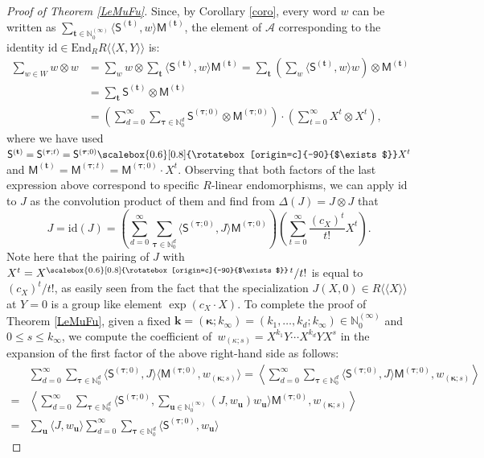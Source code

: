 \documentclass[ALCO,Unicode,published]{cedram}
\def\bk{{\mathbf{k}}}
\def\MM{{\mathsf{M}}}
\def\SS{{\mathsf{S}}}
\def\bt{{\mathbf{t}}}
\def\bu{{\mathbf{u}}}
\def\bkappa{{\boldsymbol \kappa}}
\def\btau{{\boldsymbol \tau}}
\def\lp{\langle}
\def\rp{\rangle}
\def\N{{\mathbb N}}
\def\la{\langle}
\def\ra{\rangle}
\def\lala{\la\!\la}
\def\rara{\ra\!\ra}
\def\bkappa{{\boldsymbol \kappa}}
\def\sha{\scalebox{0.6}[0.8]{\rotatebox[origin=c]{-90}{$\exists$}}}
\begin{document}
\begin{proof}[Proof of Theorem \ref{LeMuFu}]
Since, by Corollary \ref{coro}, every word $w$ can be written as 
$\sum_{\bt\in \N_0^{(\infty)}}
\lp \SS^{(\bt)},w \rp \MM^{(\bt)}$, 
the element of $\mathscr{A}$ corresponding to 
the identity $\mathrm{id}\in \mathrm{End}_RR\lala X,Y\rara$ is:
\begin{align*}
\sum_{w\in W} w\otimes w &=
\sum_w w\otimes \sum_\bt \lp \SS^{(\bt)},w \rp\MM^{(\bt)} 
=
\sum_\bt (\sum_w  \lp\SS^{(\bt)},w\rp w) \otimes \MM^{(\bt)} \\
&= 
\sum_\bt \SS^{(\bt)} \otimes \MM^{(\bt)} \\
&=
\left(\sum_{d=0}^\infty 
\sum_{\btau\in\N_0^d} \SS^{(\btau;0)}\otimes \MM^{(\btau;0)}\right)
\cdot
\left(\sum_{t=0}^\infty X^t\otimes X^t\right),
\end{align*}
where we have used
$\SS^{(\bt)}=\SS^{(\btau;t)}=\SS^{(\btau;0)}\sha X^t$ and 
$\MM^{(\bt)}=\MM^{(\btau;t)}=\MM^{(\btau;0)}\cdot X^t$.
Observing that both factors of the last expression above correspond to specific 
$R$-linear endomorphisms,
we can apply $\mathrm{id}$ to $J$ as the convolution product of them and find from
$\Delta(J)=J\otimes J$ that
\begin{equation} \label{J-expansion}
J=\mathrm{id}(J)=
\left(\sum_{d=0}^\infty 
\sum_{\btau\in\N_0^d} \lp \SS^{(\btau;0)},J \rp \MM^{(\btau;0)}\right)
\left(\sum_{t=0}^\infty \frac{(c_X)^t}{t !} X^t\right).
\end{equation}
Note here that the pairing of $J$ with 
$X^t=X^{\sha\, t}/t!$ is equal to $(c_X)^t/t !$,
as easily seen from the fact that the specialization 
$J(X,0)\in R\lala X\rara$ at $Y=0$ is a group like
element $\exp(c_X\cdot X)$.
To complete the proof of Theorem \ref{LeMuFu},
given a fixed $\bk=(\bkappa;k_\infty)=(k_1,\dots,k_d; k_\infty)\in\N_0^{(\infty)}$
and $0\le s\le k_\infty$, 
we compute
the coefficient of~$w_{(\kappa;s)}=X^{k_1}Y\cdots X^{k_d}YX^s$ in the expansion 
of the first factor of the above right-hand side as follows:
\begin{align*}
&\sum_{d=0}^\infty 
\sum_{\btau\in\N_0^d} 
\lp \SS^{(\btau;0)},J \rp 
\lp \MM^{(\btau;0)},w_{(\bkappa;s)} \rp 
=\left\lp\sum_{d=0}^\infty 
\sum_{\btau\in\N_0^d} \lp\SS^{(\btau;0)},J \rp \MM^{(\btau;0)},
w_{(\bkappa;s)} \right\rp \\
=&\left\lp\sum_{d=0}^\infty 
\sum_{\btau\in\N_0^d} 
\biggl\lp\SS^{(\btau;0)},\sum_{\bu\in \N_0^{(\infty)}}(J,w_\bu)w_\bu\biggr\rp
 \MM^{(\btau;0)},
w_{(\bkappa;s)}\right\rp \\
=&\sum_{\bu} \lp J,w_\bu \rp \sum_{d=0}^\infty 
\sum_{\btau\in\N_0^d} \lp \SS^{(\btau;0)},w_\bu \rp

\end{align*}
\end{proof}
\end{document}
